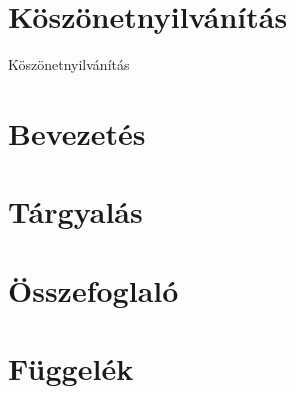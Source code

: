 \documentclass[12pt]{report}
\begin{document}

	
	
	
	
	\chapter*{Köszönetnyilvánítás}
	Köszönetnyilvánítás
	
	\tableofcontents
	
	\chapter{Bevezetés}
	
	
	
	\chapter{Tárgyalás}

	
	
	\chapter{Összefoglaló}

	
	
	\printbibliography[
	heading=bibnumbered, title={Irodalomjegyzék}]
	
	\chapter{Függelék}
	
	
	
\end{document}
